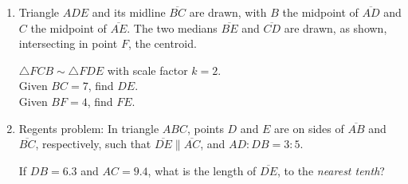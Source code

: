 \documentclass[12pt, twoside]{article}
\begin{document}
\begin{enumerate}
\newpage
\item Triangle $ADE$ and its midline $\overline{BC}$ are drawn, with $B$ the midpoint of $\overline{AD}$ and $C$ the midpoint of $\overline{AE}$. The two medians $\overline{BE}$ and $\overline{CD}$ are drawn, as shown, intersecting in point $F$, the centroid.
\begin{multicols}{2}
  $\triangle FCB \sim \triangle FDE$ with scale factor $k=2$.\\[0.25cm]
  Given $BC=7$, find $DE$. \\[0.25cm] Given $BF=4$, find $FE$. \vspace{1cm}
  \begin{center}
    \end{center}
\end{multicols} \vspace{2cm}

\item Regents problem: In triangle $ABC$, points $D$ and $E$ are on sides of $\overline{AB}$ and $\overline{BC}$, respectively, such that $\overline{DE} \parallel \overline{AC}$, and $AD:DB = 3:5$.
\begin{center}
\end{center}
If $DB=6.3$ and $AC=9.4$, what is the length of $\overline{DE}$, to the \emph{nearest tenth}?


\end{enumerate}
\end{document}

